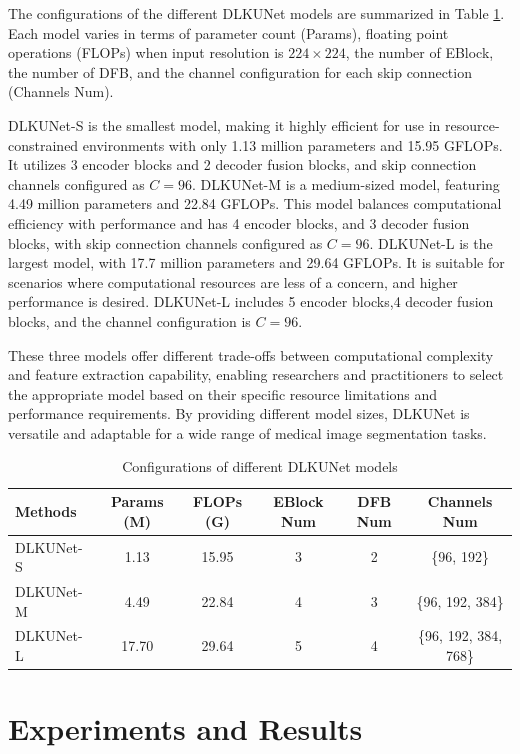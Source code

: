 \documentclass[sn-mathphys-num]{sn-jnl}
\theoremstyle{thmstyleone}%
\theoremstyle{thmstyletwo}%
\theoremstyle{thmstylethree}%
\begin{document}
The configurations of the different DLKUNet models are summarized in Table \ref{tab1}.
Each model varies in terms of parameter count (Params), floating point operations (FLOPs) when input resolution is \(224\times 224\), the number of EBlock, the number of DFB, and the channel configuration for each skip connection (Channels Num).

DLKUNet-S is the smallest model, making it highly efficient for use in resource-constrained environments with only 1.13 million parameters and 15.95 GFLOPs.
It utilizes 3 encoder blocks and 2 decoder fusion blocks, and skip connection channels configured as \(C=96\).
DLKUNet-M is a medium-sized model, featuring 4.49 million parameters and 22.84 GFLOPs.
This model balances computational efficiency with performance and has 4 encoder blocks, and 3 decoder fusion blocks, with skip connection channels configured as \(C=96\).
DLKUNet-L is the largest model, with 17.7 million parameters and 29.64 GFLOPs.
It is suitable for scenarios where computational resources are less of a concern, and higher performance is desired.
DLKUNet-L includes 5 encoder blocks,4 decoder fusion blocks, and the channel configuration is \(C=96\).

These three models offer different trade-offs between computational complexity and feature extraction capability, enabling researchers and practitioners to select the appropriate model based on their specific resource limitations and performance requirements.
By providing different model sizes, DLKUNet is versatile and adaptable for a wide range of medical image segmentation tasks.

\begin{table}[h]
    \caption{Configurations of different DLKUNet models}\label{tab1}
    \centering
    \begin{tabular*}{\textwidth}{@{\extracolsep{\fill}} lccccc}
        \toprule
        Methods & Params (M) & FLOPs (G) & EBlock Num & DFB Num & Channels Num \\
        \midrule
        DLKUNet-S & 1.13 & 15.95 & 3 & 2 & \{96, 192\} \\
        DLKUNet-M & 4.49 & 22.84 & 4 & 3 & \{96, 192, 384\} \\
        DLKUNet-L & 17.70 & 29.64 & 5 & 4 & \{96, 192, 384, 768\} \\
        \bottomrule
    \end{tabular*}
\end{table}

\section{Experiments and Results}\label{sec4}
\end{document}
